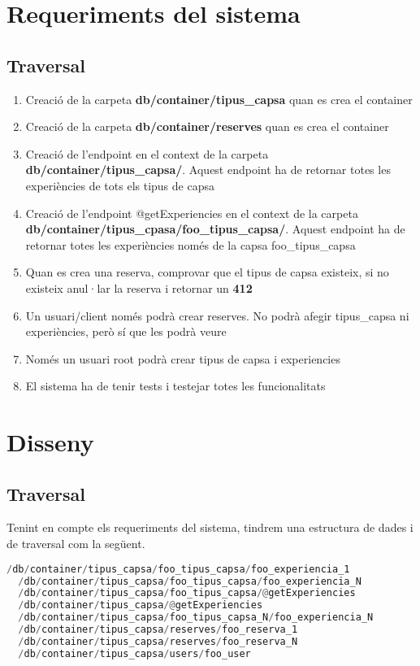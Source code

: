 \documentclass[a4paper, 11pt]{article}
\begin{document}
\section{Requeriments del sistema}
\subsection{Traversal}
\begin{enumerate}
\item Creació de la carpeta \textbf{db/container/tipus\_capsa} quan es crea el container
\item Creació de la carpeta \textbf{db/container/reserves} quan es crea el container
\item Creació de l'endpoint \@getExperiencies en el context de la
  carpeta \\ \textbf{db/container/tipus\_capsa/\@getExperiencies}. Aquest
  endpoint ha de retornar totes les experiències de tots els tipus
  de capsa
\item Creació de l'endpoint @getExperiencies en el context de la
  carpeta \\
  \textbf{db/container/tipus\_cpasa/foo\_tipus\_capsa/\@getExperiencies}. Aquest
  endpoint ha de retornar totes les experiències només de la capsa
  foo\_tipus\_capsa
\item Quan es crea una reserva, comprovar que el tipus de capsa
  existeix, si no existeix anul·lar la reserva i retornar un \textbf{412}
\item Un usuari/client només podrà crear reserves. No podrà afegir
  tipus\_capsa ni experiències, però sí que les podrà veure
\item Només un usuari root podrà crear tipus de capsa i experiencies
\item El sistema ha de tenir tests i testejar totes les funcionalitats
\end{enumerate}

\pagebreak
\section{Disseny}
\subsection{Traversal} 
Tenint en compte els requeriments del sistema, tindrem una estructura
de dades i de traversal com la següent.
\begin{lstlisting}[language=Python, caption=Estructura dades]
  /db/container/tipus_capsa/foo_tipus_capsa/foo_experiencia_1
  /db/container/tipus_capsa/foo_tipus_capsa/foo_experiencia_N
  /db/container/tipus_capsa/foo_tipus_capsa/@getExperiencies
  /db/container/tipus_capsa/@getExperiencies
  /db/container/tipus_capsa/foo_tipus_capsa_N/foo_experiencia_N
  /db/container/tipus_capsa/reserves/foo_reserva_1
  /db/container/tipus_capsa/reserves/foo_reserva_N
  /db/container/tipus_capsa/users/foo_user
\end{lstlisting}
\end{document}
